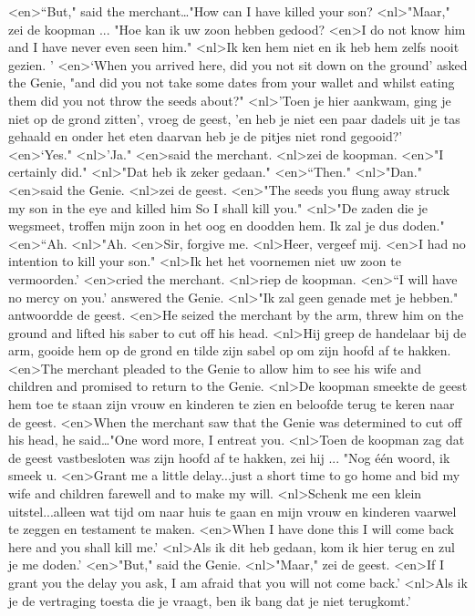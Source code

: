 <en>“But," said the merchant…"How can I have killed your son?
<nl>"Maar," zei de koopman ... "Hoe kan ik uw zoon hebben gedood?
<en>I do not know him and I have never even seen him."
<nl>Ik ken hem niet en ik heb hem zelfs nooit gezien. '
<en>‘When you arrived here, did you not sit down on the ground' asked the Genie, "and did you not take some dates from your wallet and whilst eating them did you not throw the seeds about?"
<nl>'Toen je hier aankwam, ging je niet op de grond zitten', vroeg de geest, 'en heb je niet een paar dadels uit je tas gehaald en onder het eten daarvan heb je de pitjes niet rond gegooid?'
<en>‘Yes."
<nl>'Ja."
<en>said the merchant.
<nl>zei de koopman.
<en>"I certainly did."
<nl>"Dat heb ik zeker gedaan."
<en>“Then."
<nl>"Dan."
<en>said the Genie.
<nl>zei de geest.
<en>"The seeds you flung away struck my son in the eye and killed him So I shall kill you."
<nl>"De zaden die je  wegsmeet, troffen mijn zoon in het oog en doodden hem. Ik zal je dus doden."
<en>“Ah.
<nl>"Ah.
<en>Sir, forgive me.
<nl>Heer, vergeef mij.
<en>I had no intention to kill your son."
<nl>Ik het het voornemen niet uw zoon te vermoorden.'
<en>cried the merchant.
<nl>riep de koopman.
<en>“I will have no mercy on you.’ answered the Genie.
<nl>"Ik zal geen genade met je hebben." antwoordde de geest.
<en>He seized the merchant by the arm, threw him on the ground and lifted his saber to cut off his head.
<nl>Hij greep de handelaar bij de arm, gooide hem op de grond en tilde zijn sabel op om zijn hoofd af te hakken.
<en>The merchant pleaded to the Genie to allow him to see his wife and children and promised to return to the Genie.
<nl>De koopman smeekte de geest  hem toe te staan zijn vrouw en kinderen te zien en beloofde terug te keren naar de geest.
<en>When the merchant saw that the Genie was determined to cut off his head, he said…"One word more, I entreat you.
<nl>Toen de koopman zag dat de geest vastbesloten was zijn hoofd af te hakken, zei hij ... "Nog één woord, ik smeek u.
<en>Grant me a little delay...just a short time to go home and bid my wife and children farewell and to make my will.
<nl>Schenk me een klein uitstel...alleen wat tijd om naar huis te gaan en mijn vrouw en kinderen vaarwel te zeggen en testament te maken.
<en>When I have done this I will come back here and you shall kill me.’ 
<nl>Als ik dit heb gedaan, kom ik hier terug en zul je me doden.'
<en>"But," said the Genie.
<nl>"Maar," zei de geest.
<en>If I grant you the delay you ask, I am afraid that you will not come back.’ 
<nl>Als ik je de vertraging toesta die je vraagt,  ben ik bang dat je niet terugkomt.'
